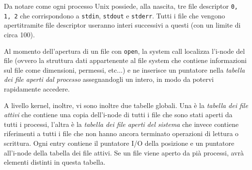 \documentclass[11pt]{article}
\begin{document}
Da notare come ogni processo Unix possiede, alla nascita, tre file descriptor \verb|0, 1, 2| che corrispondono a \verb|stdin|, \verb|stdout| e \verb|stderr|. Tutti i file che vengono apertitramite file descriptor useranno interi successivi a questi (con un limite di circa 100). 

Al momento dell'apertura di un file con \verb|open|, la system call localizza l'i-node del file (ovvero la struttura dati appartenente al file system che contiene informazioni sul file come dimensioni, permessi, etc...) e ne inserisce un puntatore nella \textit{tabella dei file aperti dal processo} assegnandogli un intero, in modo da potervi rapidamente accedere.

A livello kernel, inoltre, vi sono inoltre due tabelle globali. Una è la \textit{tabella dei file attivi} che contiene una copia dell'i-node di tutti i file che sono stati aperti da tutti i processi, l'altra è la \textit{tabella dei file aperti del sistema} che invece contiene riferimenti a tutti i file che non hanno ancora terminato operazioni di lettura o scrittura. Ogni entry contiene il puntatore I/O della posizione e un puntatore all'i-node della tabella dei file attivi. Se un file viene aperto da pià processi, avrà elementi distinti in questa tabella.
\end{document}
